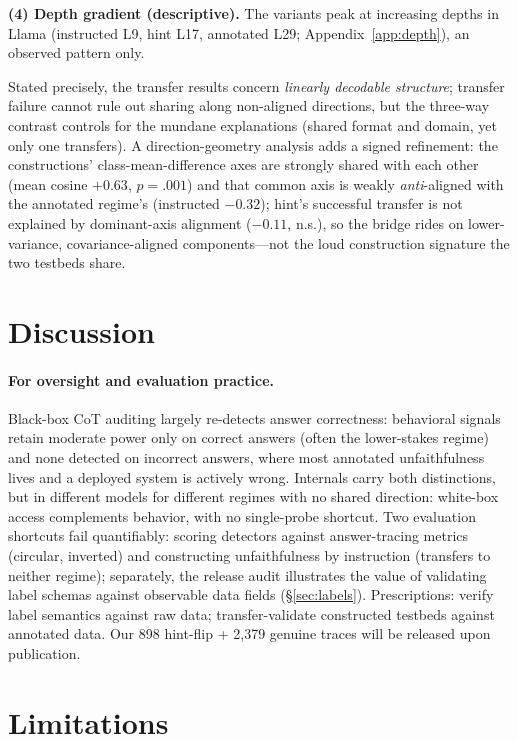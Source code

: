 \documentclass[11pt]{article}
\begin{document}
\textbf{(4) Depth gradient (descriptive).} The variants peak at increasing depths in Llama (instructed L9, hint L17, annotated L29; Appendix~\ref{app:depth}), an observed pattern only.

Stated precisely, the transfer results concern \emph{linearly decodable structure}; transfer failure cannot rule out sharing along non-aligned directions, but the three-way contrast controls for the mundane explanations (shared format and domain, yet only one transfers). A direction-geometry analysis adds a signed refinement: the constructions' class-mean-difference axes are strongly shared with each other (mean cosine $+0.63$, $p{=}.001$) and that common axis is weakly \emph{anti}-aligned with the annotated regime's (instructed $-0.32$); hint's successful transfer is not explained by dominant-axis alignment ($-0.11$, n.s.), so the bridge rides on lower-variance, covariance-aligned components---not the loud construction signature the two testbeds share.

\section{Discussion}
\label{sec:discussion}

\paragraph{For oversight and evaluation practice.} Black-box CoT auditing largely re-detects answer correctness: behavioral signals retain moderate power only on correct answers (often the lower-stakes regime) and none detected on incorrect answers, where most annotated unfaithfulness lives and a deployed system is actively wrong. Internals carry both distinctions, but in different models for different regimes with no shared direction: white-box access complements behavior, with no single-probe shortcut. Two evaluation shortcuts fail quantifiably: scoring detectors against answer-tracing metrics (circular, inverted) and constructing unfaithfulness by instruction (transfers to neither regime); separately, the release audit illustrates the value of validating label schemas against observable data fields (\S\ref{sec:labels}). Prescriptions: verify label semantics against raw data; transfer-validate constructed testbeds against annotated data. Our 898 hint-flip + 2{,}379 genuine traces will be released upon publication.


\section{Limitations}
\end{document}
